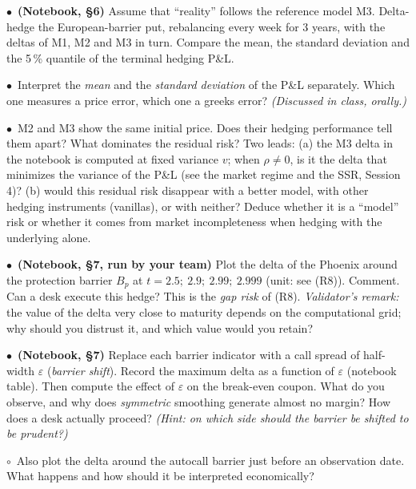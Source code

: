 \documentclass[11pt,a4paper]{article}
\newcommand{\team}{\textcolor{teamblue}{$\bullet$}}
\newcommand{\opt}{$\circ$}
\begin{document}
\begin{questions}[resume]
  \item \team\ \textbf{(Notebook, \S6)} Assume that ``reality'' follows the reference model M3. Delta-hedge the
  European-barrier put, rebalancing every week for 3 years, with the deltas of M1, M2 and M3 in
  turn. Compare the mean, the standard deviation and the 5\,\% quantile of the terminal hedging
  P\&L.

  \item \team\ Interpret the \emph{mean} and the \emph{standard deviation} of the P\&L separately. Which one measures a
  price error, which one a greeks error? \emph{(Discussed in class, orally.)}

  \item \team\ M2 and M3 show the same initial price. Does their hedging performance tell them apart? What
  dominates the residual risk? Two leads: (a) the M3 delta in the notebook is computed at fixed
  variance $v$; when $\rho \neq 0$, is it the delta that minimizes the variance of the P\&L (see the market
  regime and the SSR, Session 4)? (b) would this residual risk disappear with a better model,
  with other hedging instruments (vanillas), or with neither? Deduce whether it is a ``model'' risk
  or whether it comes from market incompleteness when hedging with the underlying alone.

  \item \team\ \textbf{(Notebook, \S7, run by your team)} Plot the delta of the Phoenix around the protection
  barrier $B_p$ at $t = 2.5;\ 2.9;\ 2.99;\ 2.999$ (unit: see (R8)). Comment. Can a desk execute this
  hedge? This is the \emph{gap risk} of (R8). \emph{Validator's remark:} the value of the delta very close to
  maturity depends on the computational grid; why should you distrust it, and which value would
  you retain?

  \item \team\ \textbf{(Notebook, \S7)} Replace each barrier indicator with a call spread of half-width $\varepsilon$ (\emph{barrier
  shift}). Record the maximum delta as a function of $\varepsilon$ (notebook table). Then compute the effect
  of $\varepsilon$ on the break-even coupon. What do you observe, and why does \emph{symmetric} smoothing
  generate almost no margin? How does a desk actually proceed? \emph{(Hint: on which side should
  the barrier be shifted to be prudent?)}

  \item \opt\ Also plot the delta around the autocall barrier just before an observation date. What happens
  and how should it be interpreted economically?
\end{questions}
\end{document}
